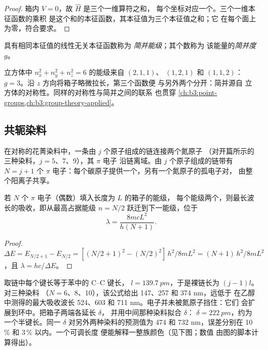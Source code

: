 \begin{proof}
箱内 $V = 0$，故 $\hat H$ 是三个一维算符之和，
每个坐标对应一个。三个一维本征函数的乘积
是这个和的本征函数，其本征值为三个本征值之和；它
在每个面上为零，符合要求。
\end{proof}

\begin{definition}[简并能级]\label{def:b3:quantum-model-systems:degenerate}
具有相同本征值的线性无关本征函数称为
\emph{简并能级}；其个数称为
该能量的\emph{简并度} $g$。
\end{definition}

\begin{example}[简并与对称性]\label{ex:b3:quantum-model-systems:cube}
立方体中 $n_x^2 + n_y^2 + n_z^2 = 6$ 的能级来自 $(2,1,1)$、
$(1,2,1)$ 和 $(1,1,2)$：$g = 3$。沿 $z$ 方向将箱子略微拉长，第三个函数便
与另外两个分开：简并源自
立方体的对称性。同样的对称性与简并之间的联系
也贯穿 \cref{ch:b3:point-groups,ch:b3:group-theory-applied}。
\end{example}

\subsection*{共轭染料}

在对称的花菁染料中，一条由 $j$ 个原子组成的链连接两个氮原子
（对开篇所示的三种染料，\(j = 5\)、7、9），其 $\pi$ 电子
沿链离域。由 $j$ 个原子组成的链带有 $N = j + 1$ 个 $\pi$
电子：每个碳原子提供一个，另有一个氮原子的孤电子对，
由整个阳离子共享。

\begin{proposition}[自由电子吸收波长]\label{prop:b3:quantum-model-systems:free-electron}
若 $N$ 个 $\pi$ 电子（偶数）填入长度为 $L$ 的箱子的能级，
每个能级两个，则最长波长的吸收，即从最高占据能级
$n = N/2$ 跃迁到下一能级，位于
\[
\lambda = \frac{8mcL^2}{h(N+1)}.
\]
\end{proposition}

\begin{proof}
$\Delta E = E_{N/2+1} - E_{N/2} = [(N/2+1)^2 - (N/2)^2]\,h^2/8mL^2 =
(N+1)\,h^2/8mL^2$，且 $\lambda = hc/\Delta E$。
\end{proof}

\begin{example}\label{ex:b3:quantum-model-systems:dyes}
取链中每个键长等于苯中的 C--C 键长，
$l = \qty{139.7}{pm}$，于是裸链长为 $(j - 1)l$。对三种染料
（$N = 6$、8、10），该公式给出 147、257 和 374 nm，远低于
在乙醇中测得的最大吸收波长 524、603 和 711 nm。电子并未被氮原子挡住：它们
会扩展到环中。把箱子两端各延长 $\delta$，
并用中间那种染料拟合 $\delta$：
$\delta = \qty{222}{pm}$，约为一个半键长。同一 $\delta$ 对另外两种染料的预测值为
474 和 732 nm，误差分别在 10\,\% 和 3\,\% 以内。一个可调长度
便能解释一整族颜色（见下图；数值
由图的脚本计算得出）。
\end{example}

